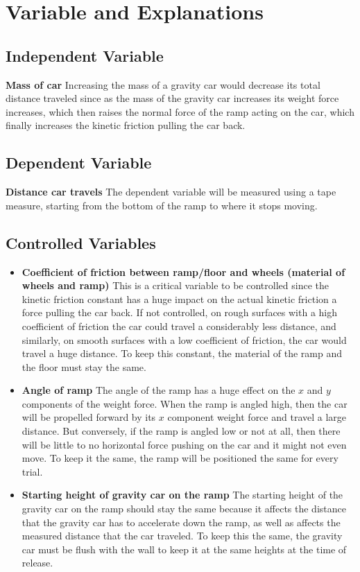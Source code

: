 \documentclass[12pt]{article}
\begin{document}
\section{Variable and Explanations}

\subsection{Independent Variable} \textbf{Mass of car} Increasing the mass of a gravity car would decrease its total distance traveled since as the mass of the gravity car increases its weight force increases, which then raises the normal force of the ramp acting on the car, which finally increases the kinetic friction pulling the car back.

\subsection{Dependent Variable} \textbf{Distance car travels} The dependent variable will be measured using a tape measure, starting from the bottom of the ramp to where it stops moving.

\subsection{Controlled Variables}
\begin{itemize}
	\item \textbf{Coefficient of friction between ramp/floor and wheels (material of wheels and ramp)} This is a critical variable to be controlled since the kinetic friction constant has a huge impact on the actual kinetic friction a force pulling the car back. If not controlled, on rough surfaces with a high coefficient of friction the car could travel a considerably less distance, and similarly, on smooth surfaces with a low coefficient of friction, the car would travel a huge distance. To keep this constant, the material of the ramp and the floor must stay the same.
	\item \textbf{Angle of ramp} The angle of the ramp has a huge effect on the \(x\) and \(y\) components of the weight force. When the ramp is angled high, then the car will be propelled forward by its \(x\) component weight force and travel a large distance. But conversely, if the ramp is angled low or not at all, then there will be little to no horizontal force pushing on the car and it might not even move. To keep it the same, the ramp will be positioned the same for every trial.
	\item \textbf{Starting height of gravity car on the ramp} The starting height of the gravity car on the ramp should stay the same because it affects the distance that the gravity car has to accelerate down the ramp, as well as affects the measured distance that the car traveled. To keep this the same, the gravity car must be flush with the wall to keep it at the same heights at the time of release.
\end{itemize}
\end{document}
